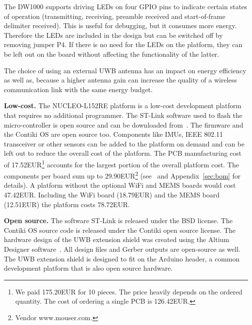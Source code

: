 \documentclass[journal,comsoc]{IEEEtran}
\begin{document}
The DW1000 supports driving LEDs on four GPIO pins to indicate certain states of operation (transmitting, receiving, preamble received and start-of-frame delimiter received). 
This is useful for debugging, but it consumes more energy. 
Therefore the LEDs are included in the design but can be switched off by removing jumper P4. 
If there is no need for the LEDs on the platform, they can be left out on the board without affecting the functionality of the latter. 

The choice of using an external UWB antenna has an impact on energy efficiency as well as, because a higher antenna gain can increase the quality of a wireless communication link with the same energy budget. 

\vspace*{0.5em}
\noindent\textbf{Low-cost.} The NUCLEO-L152RE platform is a low-cost development platform that requires no additional programmer. %
The ST-Link software used to flash the micro-controller is open source and can be downloaded from~\cite{stlinkgithub}. %
The firmware and the Contiki OS are open source too. %
Components like IMUs, IEEE 802.11 transceiver or other sensors can be added to the platform on demand and can be left out to reduce the overall cost of the platform. %
The PCB manufacturing cost of 17.52EUR\footnote{We paid 175.20EUR for 10 pieces. The price heavily depends on the ordered quantity. The cost of ordering a single PCB is 126.42EUR.} accounts for the largest portion of the overall platform cost. 
The components per board sum up to 29.90EUR\footnote{Vendor www.mouser.com.} (see~\cite{berndrepo:prodtests} and Appendix~\ref{sec:bom} for details). 
A platform without the optional WiFi and MEMS boards would cost 47.42EUR. 
Including the WiFi board (18.79EUR) and the MEMS board (12.51EUR) the platform costs 78.72EUR. 

\vspace*{0.5em}
\noindent\textbf{Open source.} The software ST-Link is released under the BSD license. 
The Contiki OS source code is released under the Contiki open source license. 
The hardware design of the UWB extension shield was created using the Altium Designer software~\cite{altiumwebsite}. 
All design files and Gerber outputs are open-source as well. 
The UWB extension shield is designed to fit on the Arduino header, a common development platform that is also open source hardware.
\end{document}
